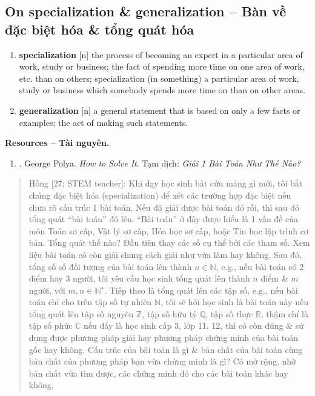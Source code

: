 \documentclass[12pt]{article}
\begin{document}
\subsection{On specialization \& generalization -- Bàn về đặc biệt hóa \& tổng quát hóa}

\begin{enumerate}\sf\small
	\item \textbf{specialization} [n] the process of becoming an expert in a particular area of work, study or business; the fact of spending more time on one area of work, etc. than on others; specialization (in something) a particular area of work, study or business which somebody spends more time on than on other areas.
	\item \textbf{generalization} [n] a general statement that is based on only a few facts or examples; the act of making such statements.
\end{enumerate}

\noindent\textbf{\textsf{Resources -- Tài nguyên.}}
\begin{enumerate}
	\item \cite{Polya2014}. George Polya. {\it How to Solve It}. {\sf Tạm dịch}: {\it Giải 1 Bài Toán Như Thế Nào?}
\end{enumerate}

\begin{quote}
	{\sf Hồng [27; STEM teacher]}: Khi dạy học sinh bất cứu mảng gì mới, tôi bắt chúng đặc biệt hóa (specialization) để xét các trường hợp đặc biệt nếu chưa rõ cấu trúc 1 bài toán. Nếu đã giải được bài toán đó rồi, thì sau đó tổng quát ``bài toán'' đó lên. ``Bài toán'' ở đây được hiểu là 1 vấn đề của môn Toán sơ cấp, Vật lý sơ cấp, Hóa học sơ cấp, hoặc Tin học lập trình cơ bản. Tổng quát thế nào? Đầu tiên thay các số cụ thể bởi các tham số. Xem liệu bài toán có còn giải chung cách giải như vừa làm hay không. Sau đó, tổng số số đối tượng của bài toán lên thành $n\in\mathbb{N}$, e.g., nếu bài toán có 2 điểm hay 3 người, tôi yêu cầu học sinh tổng quát lên thành $n$ điểm \& $m$ người, với $m,n\in\mathbb{N}^\star$. Tiếp theo là tổng quát lên các tập số, e.g., nếu bài toán chỉ cho trên tập số tự nhiên $\mathbb{N}$, tôi sẽ hỏi học sinh là bài toán này nếu tổng quát lên tập số nguyên $\mathbb{Z}$, tập số hữu tỷ $\mathbb{Q}$, tập số thực $\mathbb{R}$, thậm chí là tập số phức $\mathbb{C}$ nếu đấy là học sinh cấp 3, lớp 11, 12, thì có còn đúng \& sử dụng được phương pháp giải hay phương pháp chứng minh của bài toán gốc hay không. Cấu trúc của bài toán là gì \& bản chất của bài toán cùng bản chất của phương pháp bạn vừa chứng minh là gì? Có mở rộng, nhờ bản chất vừa tìm được, các chứng minh đó cho các bài toán khác hay không.
\end{quote}
\end{document}
